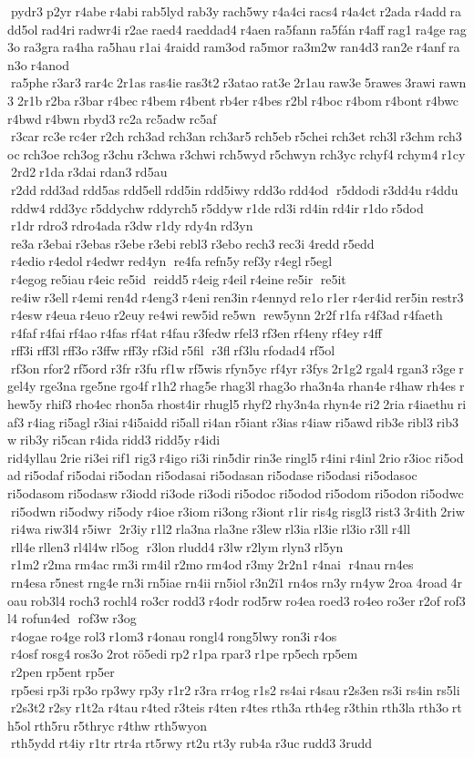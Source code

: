  pydr3 p2yr r4abe r4abi rab5lyd rab3y rach5wy r4a4ci racs4 r4a4ct r2ada r4add radd5ol rad4ri radwr4i r2ae raed4 raeddad4 r4aen ra5fann ra5fán r4aff rag1 ra4ge rag3o ra3gra ra4ha ra5hau r1ai 4raidd ram3od ra5mor ra3m2w ran4d3 ran2e r4anf ran3o r4anod  ra5phe r3ar3 rar4c 2r1as ras4ie ras3t2 r3atao rat3e 2r1au raw3e 5rawes 3rawi rawn3 2r1b r2ba r3bar r4bec r4bem r4bent rb4er r4bes r2bl r4boc r4bom r4bont r4bwc r4bwd r4bwn rbyd3 rc2a rc5adw rc5af  r3car rc3e rc4er r2ch rch3ad rch3an rch3ar5 rch5eb r5chei rch3et rch3l r3chm rch3oc rch3oe rch3og r3chu r3chwa r3chwi rch5wyd r5chwyn rch3yc rchyf4 rchym4 r1cy 2rd2 r1da r3dai rdan3 rd5au  r2dd rdd3ad rdd5as rdd5ell rdd5in rdd5iwy rdd3o rdd4od  r5ddodi r3dd4u r4ddu  rddw4 rdd3yc r5ddychw rddyrch5 r5ddyw r1de rd3i rd4in rd4ir r1do r5dod  r1dr rdro3 rdro4ada r3dw r1dy rdy4n rd3yn  re3a r3ebai r3ebas r3ebe r3ebi rebl3 r3ebo rech3 rec3i 4redd r5edd  r4edio r4edol r4edwr red4yn  re4fa refn5y ref3y r4egl r5egl  r4egog re5iau r4eic re5id  reidd5 r4eig r4eil r4eine re5ir  re5it  re4iw r3ell r4emi ren4d r4eng3 r4eni ren3in r4ennyd re1o r1er r4er4id rer5in restr3 r4esw r4eua r4euo r2euy re4wi rew5id re5wn  rew5ynn 2r2f r1fa r4f3ad r4faeth  r4faf r4fai rf4ao r4fas rf4at r4fau r3fedw rfel3 rf3en rf4eny rf4ey r4ff  rff3i rff3l rff3o r3ffw rff3y rf3id r5fil  r3fl rf3lu rfodad4 rf5ol  rf3on rfor2 rf5ord r3fr r3fu rf1w rf5wis rfyn5yc rf4yr r3fys 2r1g2 rgal4 rgan3 r3ge rgel4y rge3na rge5ne rgo4f r1h2 rhag5e rhag3l rhag3o rha3n4a rhan4e r4haw rh4es rhew5y rhif3 rho4ec rhon5a rhost4ir rhugl5 rhyf2 rhy3n4a rhyn4e ri2 2ria r4iaethu riaf3 r4iag ri5agl r3iai r4i5aidd ri5all ri4an r5iant r3ias r4iaw ri5awd rib3e ribl3 rib3w rib3y ri5can r4ida ridd3 ridd5y r4idi 	rid4yllau 2rie ri3ei rif1 rig3 r4igo ri3i rin5dir rin3e ringl5 r4ini r4inl 2rio r3ioc ri5odad ri5odaf ri5odai ri5odan 	ri5odasai 	ri5odasan ri5odase ri5odasi 	ri5odasoc 	ri5odasom ri5odasw r3iodd ri3ode ri3odi ri5odoc ri5odod ri5odom ri5odon ri5odwc ri5odwn ri5odwy ri5ody r4ioe r3iom ri3ong r3iont r1ir ris4g risgl3 rist3 3r4ith 2riw ri4wa riw3l4 r5iwr  2r3iy r1l2 rla3na rla3ne r3lew rl3ia rl3ie rl3io r3ll r4ll  rll4e rllen3 rl4l4w rl5og  r3lon rludd4 r3lw r2lym rlyn3 rl5yn  r1m2 r2ma rm4ac rm3i rm4il r2mo rm4od r3my 2r2n1 r4nai  r4nau rn4es  rn4esa r5nest rng4e rn3i rn5iae rn4ii rn5iol r3n2ï1 rn4os rn3y rn4yw 2roa 4road 4roau rob3l4 roch3 rochl4 ro3cr rodd3 r4odr rod5rw ro4ea roed3 ro4eo ro3er r2of rof3l4 	rofun4ed  rof3w r3og  r4ogae ro4ge rol3 r1om3 r4onau rongl4 rong5lwy ron3i r4os  r4osf rosg4 ros3o 2rot rö5edi rp2 r1pa rpar3 r1pe rp5ech rp5em  r2pen rp5ent rp5er  rp5esi rp3i rp3o rp3wy rp3y r1r2 r3ra rr4og r1s2 rs4ai r4sau r2s3en rs3i rs4in rs5li  r2s3t2 r2sy r1t2a r4tau r4ted r3teis r4ten r4tes rth3a rth4eg r3thin rth3la rth3o rth5ol rth5ru r5thryc r4thw 	rth5wyon  rth5ydd rt4iy r1tr rtr4a rt5rwy rt2u rt3y rub4a r3uc rudd3 3rudd 